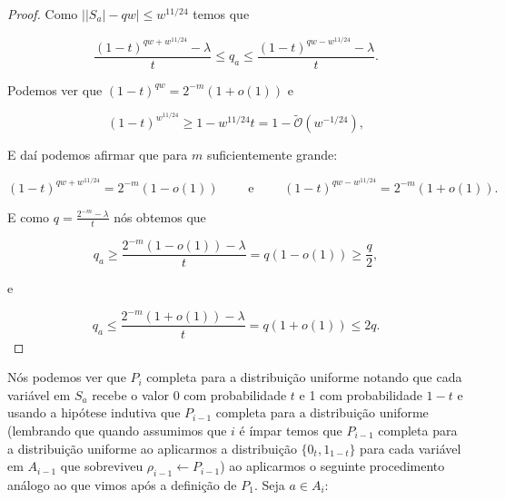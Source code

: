 \begin{proof}

Como $\big\lvert \lvert S_{a} \rvert - qw \big\rvert \leq w^{11/24}$ temos que

\begin{equation*}
	\frac{(1 - t)^{qw + w^{11/24}} - \lambda}{t} \leq q_{a} \leq \frac{(1 - t)^{qw - w^{11/24}} - \lambda}{t}.
\end{equation*}

Podemos ver que $(1 - t)^{qw} = 2^{-m}(1 + o(1))$ e

\begin{equation*}
	(1 - t)^{w^{11/24}} \geq 1 - w^{11/24}t = 1 - \widetilde{\mathcal{O}}(w^{-1/24}),
\end{equation*}

E daí podemos afirmar que para $m$ suficientemente grande:

\begin{equation*}
	(1 - t)^{qw + w^{11/24}} = 2^{-m}(1 - o(1)) \qquad \text{ e } \qquad (1 - t)^{qw - w^{11/24}} = 2^{-m}(1 + o(1)).
\end{equation*}

E como $q = \frac{2^{-m} - \lambda}{t}$ nós obtemos que

\begin{equation*}
	q_{a} \geq \frac{2^{-m}(1 - o(1)) - \lambda}{t} = q(1 - o(1)) \geq \frac{q}{2},
\end{equation*}

e

\begin{equation*}
	q_{a} \leq \frac{2^{-m}(1 + o(1)) - \lambda}{t} = q(1 + o(1)) \leq 2q.
\end{equation*}

\end{proof}

Nós podemos ver que $P_{i}$ completa para a distribuição uniforme notando que cada variável em $S_{a}$ recebe o valor 0 com probabilidade $t$ e 1 com probabilidade $1 - t$ e usando a hipótese indutiva que $P_{i - 1}$ completa para a distribuição uniforme (lembrando que quando assumimos que $i$ é ímpar temos que $P_{i - 1}$ completa para a distribuição uniforme ao aplicarmos a distribuição $\{0_{t}, 1_{1 - t}\}$ para cada variável em $A_{i - 1}$ que sobreviveu $\rho_{i - 1} \leftarrow P_{i - 1}$) ao aplicarmos o seguinte procedimento análogo ao que vimos após a definição de $P_{1}$. Seja $a \in A_{i}$:

